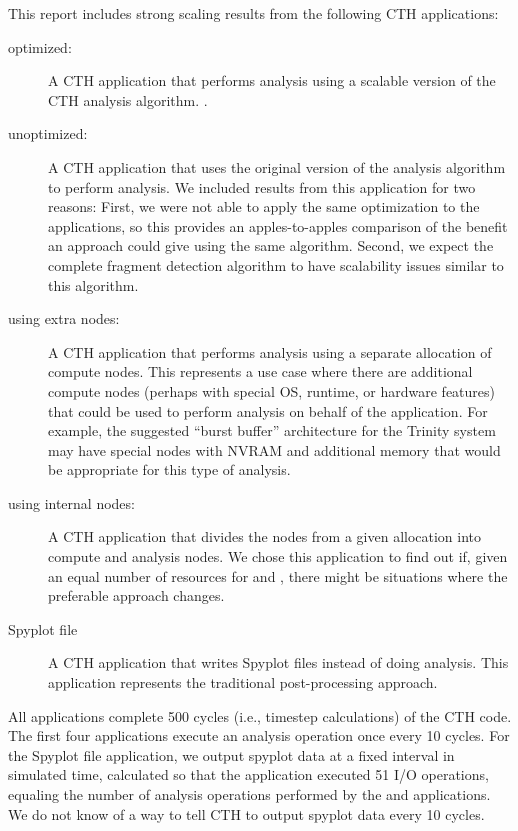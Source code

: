 This report includes strong scaling results from the following CTH
applications:
\begin{description}

\item [\Insitu optimized:] A CTH application that performs \insitu analysis
using a scalable version of the CTH analysis algorithm. .  

\item [\Insitu unoptimized:] A CTH application that uses the original version of the 
analysis algorithm to perform \insitu analysis.     We included results from this application for two reasons: First,
we were not able to apply the same optimization to the \intransit applications,
so this provides an apples-to-apples comparison of the benefit an \intransit
approach could give using the same algorithm.  Second, we expect the complete
fragment detection algorithm to have scalability issues similar to this
algorithm. 

\item [\Intransit using extra nodes:] A CTH application that performs \intransit analysis
using a separate allocation of compute nodes.  This represents a use case where there are 
additional compute nodes (perhaps with special OS, runtime, or hardware features) that
could be used to perform analysis on behalf of the application.   For example, the suggested
``burst buffer'' architecture for the Trinity system may have special nodes
with NVRAM and additional memory that would be appropriate for this type of
\intransit analysis. 

\item [\Intransit using internal nodes:] A CTH application that divides the nodes from a given
allocation into compute and analysis nodes.  We chose this application to find out if, 
given an equal number of resources for \insitu and \intransit, there might be
situations where the preferable approach changes.  

\item [Spyplot file] A CTH application that writes Spyplot files instead of doing 
analysis.  This application represents the traditional post-processing approach.
\end{description}

All applications complete 500 cycles (i.e., timestep calculations) of the CTH
code. The first four applications execute an analysis operation once every 10
cycles.  For the Spyplot file application, we output spyplot data at a fixed 
interval in simulated time, calculated so that the application executed 51
I/O operations, equaling the number of analysis operations performed by the
\insitu and \intransit applications.  We do not know of a way to tell CTH to
output spyplot data every 10 cycles. 


